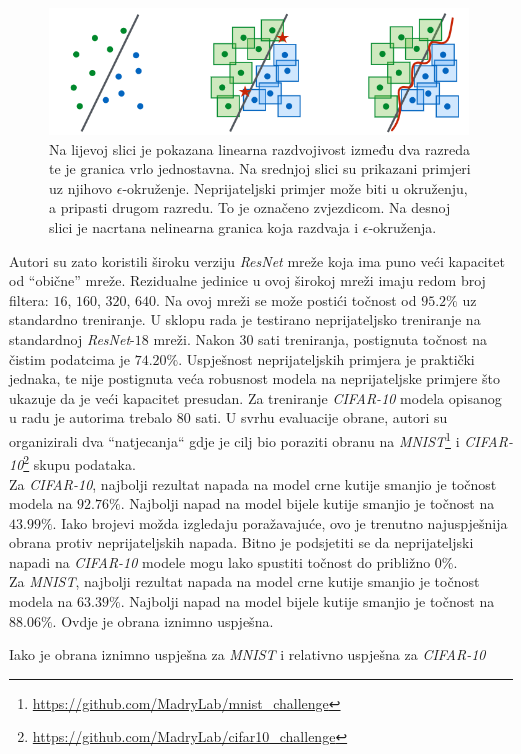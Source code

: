 \documentclass[utf8, diplomski]{fer}
\begin{document}
\begin{figure}[H]
\centering
\includegraphics[width=0.99\textwidth,keepaspectratio]{img/other/pgd_nonlinearity.png}
\caption{Na lijevoj slici je pokazana linearna razdvojivost između dva razreda te je granica vrlo jednostavna. Na srednjoj slici su prikazani primjeri uz njihovo $\epsilon$-okruženje. Neprijateljski primjer može biti u okruženju, a pripasti drugom razredu. To je označeno zvjezdicom. Na desnoj slici je nacrtana nelinearna granica koja razdvaja i $\epsilon$-okruženja.}
\label{fig:pgd_nonlinearity}
\end{figure}

Autori su zato koristili široku verziju \textit{ResNet} mreže koja ima puno veći kapacitet od ``obične'' mreže. Rezidualne jedinice u ovoj širokoj mreži imaju redom broj filtera: $16$, $160$, $320$, $640$. Na ovoj mreži se može postići točnost od $95.2\%$ uz standardno treniranje. U sklopu rada je testirano neprijateljsko treniranje na standardnoj \textit{ResNet}-$18$ mreži. Nakon $30$ sati treniranja, postignuta točnost na čistim podatcima je $74.20\%$. Uspješnost neprijateljskih primjera je praktički jednaka, te nije postignuta veća robusnost modela na neprijateljske primjere što ukazuje da je veći kapacitet presudan. Za treniranje \textit{CIFAR-10} modela opisanog u radu je autorima trebalo $80$ sati. U svrhu evaluacije obrane, autori su organizirali dva ``natjecanja`` gdje je cilj bio poraziti obranu na \textit{MNIST}\footnote{\url{https://github.com/MadryLab/mnist_challenge}} i \textit{CIFAR-10}\footnote{\url{https://github.com/MadryLab/cifar10_challenge}} skupu podataka. 
\\
Za \textit{CIFAR-10}, najbolji rezultat napada na model crne kutije smanjio je točnost modela na $92.76\%$. Najbolji napad na model bijele kutije smanjio je točnost na $43.99\%$. Iako brojevi možda izgledaju poražavajuće, ovo je trenutno najuspješnija obrana protiv neprijateljskih napada. Bitno je podsjetiti se da neprijateljski napadi na \textit{CIFAR-10} modele mogu lako spustiti točnost do približno $0\%$.
\\
Za \textit{MNIST}, najbolji rezultat napada na model crne kutije smanjio je točnost modela na $63.39\%$. Najbolji napad na model bijele kutije smanjio je točnost na $88.06\%$. Ovdje je obrana iznimno uspješna.
\par
Iako je obrana iznimno uspješna za \textit{MNIST} i relativno uspješna za \textit{CIFAR-10} 
\end{document}
